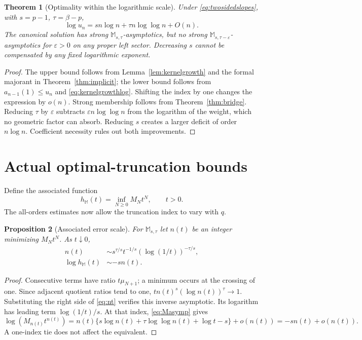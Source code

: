 \documentclass[11pt,a4paper]{article}
\numberwithin{equation}{section}
\newtheorem{theorem}{Theorem}[section]
\newtheorem{proposition}[theorem]{Proposition}
\theoremstyle{definition}\newtheorem{definition}[theorem]{Definition}
\theoremstyle{remark}\newtheorem{remark}[theorem]{Remark}
\newcommand{\M}{\mathbb M}\newcommand{\CM}{\mathcal C_{\M}}
\begin{document}
\begin{theorem}[Optimality within the logarithmic scale]
\label{thm:logoptimal}
Under \eqref{eq:twosidedslopes}, with $s=p-1$, $\tau=\beta-p$,
\begin{equation}
 \log u_n=sn\log n+\tau n\log\log n+O(n).
 \label{eq:ulog}
\end{equation}
The canonical solution has strong $\M_{s,\tau}$-asymptotics, but no
strong $\M_{s,\tau-\varepsilon}$-asymptotics for $\varepsilon>0$ on
any proper left sector. Decreasing $s$ cannot be compensated by any fixed
logarithmic exponent.
\end{theorem}
\begin{proof}
The upper bound follows from Lemma~\ref{lem:kernelgrowth} and the formal
majorant in Theorem~\ref{thm:implicit}; the lower bound follows from
$a_{n-1}(1)\le u_n$ and \eqref{eq:kernelgrowthlog}. Shifting the index
by one changes the expression by $o(n)$. Strong membership follows from
Theorem~\ref{thm:bridge}.
Reducing $\tau$ by $\varepsilon$ subtracts
$\varepsilon n\log\log n$ from the logarithm of the weight, which no
geometric factor can absorb. Reducing $s$ creates a larger deficit of
order $n\log n$. Coefficient necessity rules out both improvements.
\end{proof}

\section{Actual optimal-truncation bounds}
\label{sec:optimal}
Define the associated function
\begin{equation}
 h_{\M}(t)=\inf_{N\ge0}M_Nt^N,\qquad t>0.
 \label{eq:hM}
\end{equation}
The all-orders estimates now allow the truncation index to vary with $q$.

\begin{proposition}[Associated error scale]
\label{prop:hM}
For $\M_{s,\tau}$ let $n(t)$ be an integer minimizing $M_Nt^N$.
As $t\downarrow0$,
\begin{align}
 n(t)&\sim s^{\tau/s}t^{-1/s}(\log(1/t))^{-\tau/s},\label{eq:nt}\\
 \log h_{\M}(t)&\sim-sn(t).\label{eq:hMasymp}
\end{align}
\end{proposition}
\begin{proof}
Consecutive terms have ratio $t\mu_{N+1}$; a minimum occurs at the
crossing of one. Since adjacent quotient ratios tend to one,
$t n(t)^s(\log n(t))^\tau\to1$. Substituting the right side of
\eqref{eq:nt} verifies this inverse asymptotic. Its logarithm has leading
term $\log(1/t)/s$. At that index, \eqref{eq:Masymp} gives
\[
 \log(M_{n(t)}t^{n(t)})
 =n(t)\{s\log n(t)+\tau\log\log n(t)+\log t-s\}+o(n(t))
 =-sn(t)+o(n(t)).
\]
A one-index tie does not affect the equivalent.
\end{proof}
\end{document}
